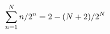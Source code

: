 \documentclass[preview]{standalone}
\begin{document}
\begin{align*}
\special{dvisvgm:raw <g id='unique000'>}\sum_{n=1}^N n/2^n=2-(N+2)/2^N\special{dvisvgm:raw </g>}
\end{align*}
\end{document}
